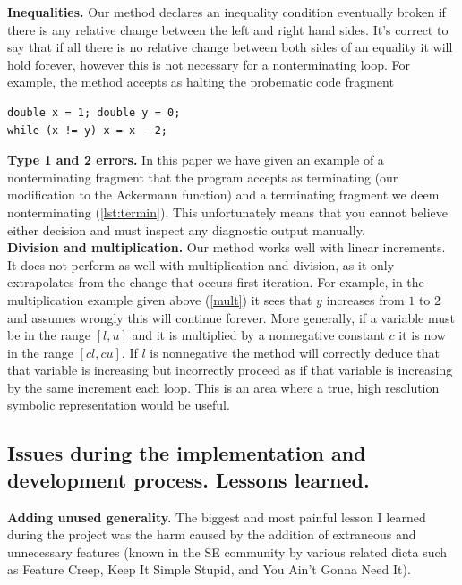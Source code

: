 \documentclass[12pt,a4paper]{article}
\begin{document}
\textbf{Inequalities.} Our method declares an inequality condition eventually broken if there is any relative change between the left and right hand sides.
It's correct to say that if all there is no relative change between both sides of an equality it will hold forever, however this is not necessary for a nonterminating loop.
For example, the method accepts as halting the probematic code fragment
\begin{center}
\begin{minipage}{6.5cm}
\begin{lstlisting}[language=myLang, frame=tlrb, numbers=none, linewidth=6cm]
double x = 1; double y = 0;
while (x != y) x = x - 2;
\end{lstlisting}
\end{minipage}
\end{center}

\textbf{Type 1 and 2 errors.} In this paper we have given an example of a nonterminating fragment that the program accepts as terminating (our modification to the
Ackermann function) and a terminating fragment we deem nonterminating (\cref{lst:termin}). This unfortunately means that you cannot believe either decision and must
inspect any diagnostic output manually.\\

\textbf{Division and multiplication.} Our method works well with linear increments. It does not perform as well with multiplication and division, as it only extrapolates
from the change that occurs first iteration. For example, in the multiplication example given above (\cref{mult}) it sees that $y$ increases from $1$ to $2$
and assumes wrongly this will continue forever. More generally, if a variable must be in the range $[l, u]$ and it is multiplied by a nonnegative constant $c$ it is now in the range $[cl, cu]$. If $l$ is nonnegative the method will correctly deduce that that variable is increasing but incorrectly proceed as if that variable is increasing by the same increment each loop. This is an area where a true, high resolution symbolic representation would be useful.

\subsection{Issues during the implementation and development process. Lessons learned.}

\textbf{Adding unused generality.} The biggest and most painful lesson I learned during the project was the harm caused by the addition of extraneous and unnecessary features (known in the SE community
by various related dicta such as Feature Creep, Keep It Simple Stupid, and You Ain't Gonna Need It).
\end{document}
